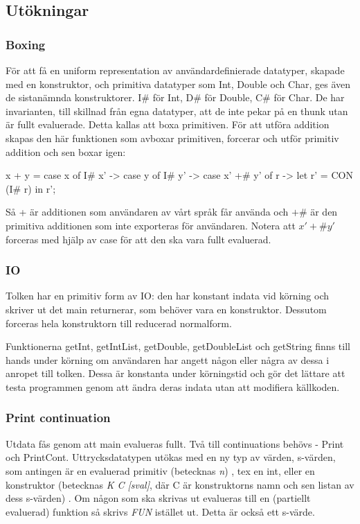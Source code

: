 \documentclass[../Core]{subfiles}
\begin{document}
\subsection{Utökningar}

\subsubsection{Boxing}

För att få en uniform representation av användardefinierade datatyper, skapade
med en konstruktor, och primitiva datatyper som Int, Double och Char, ges även 
de sistanämnda konstruktorer. I\# för Int, D\# för Double, C\# för Char. De har
invarianten, till skillnad från egna datatyper, att de inte pekar på en thunk
utan är fullt evaluerade. Detta kallas att boxa primitiven.
    För att utföra addition skapas den här funktionen som avboxar primitiven,
forcerar och utför primitiv addition och sen boxar igen:

\begin{codeEx}
x + y = case x of 
    { I# x' -> case y of
        { I# y' -> case x' +# y' of
            { r -> let r' = CON (I# r) in  r'}}};
\end{codeEx}

Så + är additionen som användaren av vårt språk får använda och $ +\# $ är den
primitiva additionen som inte exporteras för användaren. Notera att $ x' +\# y' $
forceras med hjälp av case för att den ska vara fullt evaluerad.

\subsubsection{IO}
Tolken har en primitiv form av IO: den har konstant indata vid körning och
skriver ut det main returnerar, som behöver vara en konstruktor. Dessutom
forceras hela konstruktorn till reducerad normalform.

Funktionerna getInt, getIntList, getDouble, getDoubleList och getString finns
till hands under körning om användaren har angett någon eller några av dessa
i anropet till tolken. Dessa är konstanta under körningstid och gör det
lättare att testa programmen genom att ändra deras indata utan att modifiera
källkoden.

\subsubsection{Print continuation}
Utdata fås genom att main evalueras fullt. Två till continuations behövs - 
Print och PrintCont. Uttrycksdatatypen utökas med en ny typ av värden, 
s-värden, som antingen är en evaluerad primitiv (betecknas \emph{n})
, tex en int, eller en konstruktor (betecknas \emph{K C [sval]}, där
C är konstruktorns namn och sen listan av dess s-värden) .
Om någon som ska skrivas ut evalueras till en (partiellt evaluerad)
funktion så skrivs \emph{FUN} istället ut. Detta är också ett s-värde.
\end{document}
